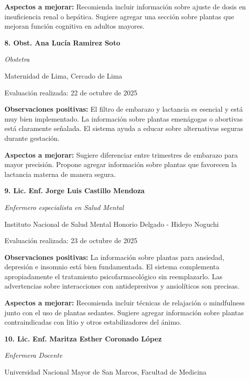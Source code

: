 \documentclass[12pt,a4paper]{article}
\begin{document}
\textbf{Aspectos a mejorar:} Recomienda incluir información sobre ajuste de dosis en insuficiencia renal o hepática. Sugiere agregar una sección sobre plantas que mejoran función cognitiva en adultos mayores.

\vspace{0.3cm}

\textbf{8. Obst. Ana Lucía Ramirez Soto}

\textit{Obstetra}

Maternidad de Lima, Cercado de Lima

Evaluación realizada: 22 de octubre de 2025

\textbf{Observaciones positivas:} El filtro de embarazo y lactancia es esencial y está muy bien implementado. La información sobre plantas emenágogas o abortivas está claramente señalada. El sistema ayuda a educar sobre alternativas seguras durante gestación.

\textbf{Aspectos a mejorar:} Sugiere diferenciar entre trimestres de embarazo para mayor precisión. Propone agregar información sobre plantas que favorecen la lactancia materna de manera segura.

\vspace{0.3cm}

\textbf{9. Lic. Enf. Jorge Luis Castillo Mendoza}

\textit{Enfermero especialista en Salud Mental}

Instituto Nacional de Salud Mental Honorio Delgado - Hideyo Noguchi

Evaluación realizada: 23 de octubre de 2025

\textbf{Observaciones positivas:} La información sobre plantas para ansiedad, depresión e insomnio está bien fundamentada. El sistema complementa apropiadamente el tratamiento psicofarmacológico sin reemplazarlo. Las advertencias sobre interacciones con antidepresivos y ansiolíticos son precisas.

\textbf{Aspectos a mejorar:} Recomienda incluir técnicas de relajación o mindfulness junto con el uso de plantas sedantes. Sugiere agregar información sobre plantas contraindicadas con litio y otros estabilizadores del ánimo.

\vspace{0.3cm}

\textbf{10. Lic. Enf. Maritza Esther Coronado López}

\textit{Enfermera Docente}

Universidad Nacional Mayor de San Marcos, Facultad de Medicina
\end{document}
